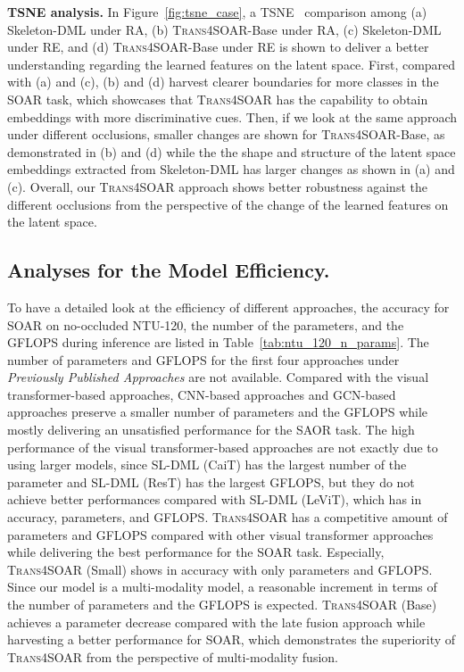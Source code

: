 \documentclass[lettersize,journal]{IEEEtran}
\begin{document}
\noindent\textbf{TSNE analysis. } In Figure~\ref{fig:tsne_case}, a TSNE~\cite{van2008visualizing} comparison among (a) Skeleton-DML under RA, (b) \textsc{Trans4SOAR}-Base under RA, (c) Skeleton-DML under RE, and (d) \textsc{Trans4SOAR}-Base under RE is shown to deliver a better understanding regarding the learned features on the latent space. First, compared with (a) and (c), (b) and (d) harvest clearer boundaries for more classes in the SOAR task, which showcases that \textsc{Trans4SOAR} has the capability to obtain embeddings with more discriminative cues. Then, if we look at the same approach under different occlusions, smaller changes are shown for \textsc{Trans4SOAR}-Base, as demonstrated in (b) and (d) while the the shape and structure of the latent space embeddings extracted from Skeleton-DML has larger changes as shown in (a) and (c). Overall, our \textsc{Trans4SOAR} approach shows better robustness against the different occlusions from the perspective of the change of the learned features on the latent space.

\subsection{Analyses for the Model Efficiency.}
To have a detailed look at the efficiency of different approaches, the accuracy for SOAR on no-occluded NTU-120, the number of the parameters, and the GFLOPS during inference are listed in Table~\ref{tab:ntu_120_n_params}. The number of parameters and GFLOPS for the first four approaches under \textit{Previously Published Approaches} are not available.
Compared with the visual transformer-based approaches, CNN-based approaches and GCN-based approaches preserve a smaller number of parameters and the GFLOPS while mostly delivering an unsatisfied performance for the SAOR task. 
The high performance of the visual transformer-based approaches are not exactly due to using larger models, since SL-DML (CaiT) has the largest number of the parameter and SL-DML (ResT) has the largest GFLOPS, but they do not achieve better performances compared with SL-DML (LeViT), which has  in accuracy,  parameters, and  GFLOPS. \textsc{Trans4SOAR} has a competitive amount of parameters and GFLOPS compared with other visual transformer approaches while delivering the best performance for the SOAR task. Especially, \textsc{Trans4SOAR} (Small) shows  in accuracy with only  parameters and  GFLOPS. Since our model is a multi-modality model, a reasonable increment in terms of the number of parameters and the GFLOPS is expected. \textsc{Trans4SOAR} (Base) achieves a  parameter decrease compared with the late fusion approach while harvesting a better performance for SOAR, which demonstrates the superiority of \textsc{Trans4SOAR} from the perspective of multi-modality fusion.
\end{document}
